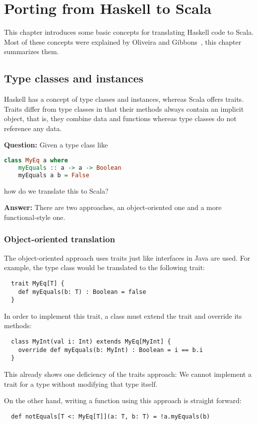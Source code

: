 \chapter{Porting from Haskell to Scala}

This chapter introduces some basic concepts for translating Haskell code
to Scala. Most of these concepts were explained by Oliveira and Gibbons~\cite{scalagp}, this
chapter summarizes them.

\section{Type classes and instances}

Haskell has a concept of type classes and instances, whereas Scala offers
traits. Traits differ from type classes in that their methods always contain
an implicit  object, that is, they combine data and functions
whereas type classes do not reference any data.

\textbf{Question:} Given a type class like
\begin{lstlisting}[language=Haskell]
  class MyEq a where
    myEquals :: a -> a -> Boolean
    myEquals a b = False
\end{lstlisting}
how do we translate this to Scala?

\textbf{Answer:} There are two approaches, an object-oriented one and a more
functional-style one.

\subsection{Object-oriented translation}
The object-oriented approach uses traits just like interfaces in
Java are used. For example, the  type class would be translated
to the following trait:
\begin{lstlisting}
  trait MyEq[T] {
    def myEquals(b: T) : Boolean = false
  }
\end{lstlisting}
In order to implement this trait, a class must extend the
trait and override its methods:
\begin{lstlisting}
  class MyInt(val i: Int) extends MyEq[MyInt] {
    override def myEquals(b: MyInt) : Boolean = i == b.i
  }
\end{lstlisting}
This already shows one deficiency of the traits approach: We cannot
implement a trait for a type without modifying that type itself.

On the other hand, writing a function using this approach is straight forward:
\begin{lstlisting}
  def notEquals[T <: MyEq[T]](a: T, b: T) = !a.myEquals(b)
\end{lstlisting}

